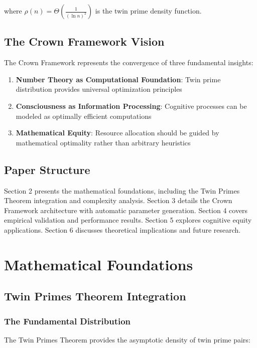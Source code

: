 \documentclass[12pt,a4paper]{article}
\begin{document}
where $\rho(n) = \Theta\left(\frac{1}{(\ln n)^2}\right)$ is the twin prime density function.

\subsection{The Crown Framework Vision}

The Crown Framework represents the convergence of three fundamental insights:

\begin{enumerate}
    \item \textbf{Number Theory as Computational Foundation}: Twin prime distribution provides universal optimization principles
    \item \textbf{Consciousness as Information Processing}: Cognitive processes can be modeled as optimally efficient computations  
    \item \textbf{Mathematical Equity}: Resource allocation should be guided by mathematical optimality rather than arbitrary heuristics
\end{enumerate}

\subsection{Paper Structure}

Section 2 presents the mathematical foundations, including the Twin Primes Theorem integration and complexity analysis. Section 3 details the Crown Framework architecture with automatic parameter generation. Section 4 covers empirical validation and performance results. Section 5 explores cognitive equity applications. Section 6 discusses theoretical implications and future research.

\section{Mathematical Foundations}

\subsection{Twin Primes Theorem Integration}

\subsubsection{The Fundamental Distribution}

The Twin Primes Theorem provides the asymptotic density of twin prime pairs:
\end{document}
